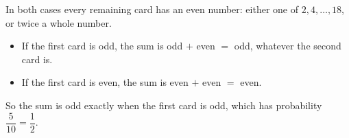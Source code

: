 In both cases every remaining card has an even number: either one of $2,4,\dots,18$, or twice a whole number.
\begin{itemize}
\item If the first card is odd, the sum is odd $+$ even $=$ odd, whatever the second card is.
\item If the first card is even, the sum is even $+$ even $=$ even.
\end{itemize}
So the sum is odd exactly when the first card is odd, which has probability $\dfrac{5}{10}=\boxed{\dfrac12}$.
